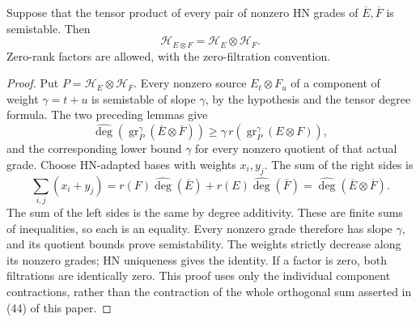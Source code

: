 \begin{lemma}
\label{lem:tensor-hn-identification}
\leanok
Suppose that the tensor product of every pair of nonzero HN grades of
$\overline E,\overline F$ is semistable. Then
\[
 \mathcal H_{E\otimes F}=\mathcal H_E\otimes\mathcal H_F.
\]
Zero-rank factors are allowed, with the zero-filtration convention.
\end{lemma}
\begin{proof}
Put $P=\mathcal H_E\otimes\mathcal H_F$. Every nonzero source
$E_t\otimes F_u$ of a component of weight $\gamma=t+u$ is semistable
of slope $\gamma$, by the hypothesis and the tensor degree formula.
The two preceding lemmas give
\[
 \widehat{\deg}(\operatorname{gr}_P^\gamma(\overline E\otimes\overline F))
 \ge \gamma\,r(\operatorname{gr}_P^\gamma(E\otimes F)),
\]
and the corresponding lower bound $\gamma$ for every nonzero quotient
of that actual grade. Choose HN-adapted bases with weights $x_i,y_j$.
The sum of the right sides is
\[
 \sum_{i,j}(x_i+y_j)=r(F)\widehat{\deg}(\overline E)
  +r(E)\widehat{\deg}(\overline F)
  =\widehat{\deg}(\overline E\otimes\overline F).
\]
The sum of the left sides is the same by degree additivity. These are
finite sums of inequalities, so each is an equality. Every nonzero grade
therefore has slope $\gamma$, and its quotient bounds prove semistability.
The weights strictly decrease along its nonzero grades; HN uniqueness
gives the identity. If a factor is zero, both filtrations are identically zero.
This proof uses only the individual component contractions, rather than
the contraction of the whole orthogonal sum asserted in (44) of this paper.
\end{proof}

